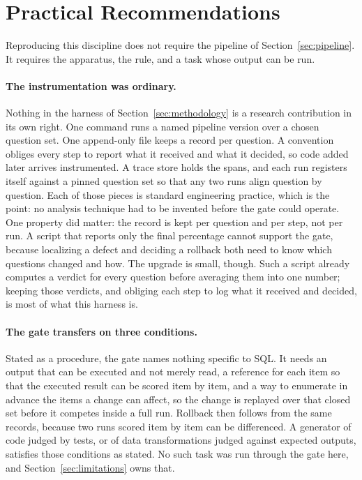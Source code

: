 \section{Practical Recommendations}
\label{sec:impact}

Reproducing this discipline does not require the pipeline of
Section~\ref{sec:pipeline}. It requires the apparatus, the rule, and a task
whose output can be run.

\paragraph{The instrumentation was ordinary.} Nothing in the harness of
Section~\ref{sec:methodology} is a research contribution in its own right. One
command runs a named pipeline version over a chosen question set. One
append-only file keeps a record per question. A convention obliges every step
to report what it received and what it decided, so code added later arrives
instrumented. A trace store holds the spans, and each run registers itself
against a pinned question set so that any two runs align question by question.
Each of those pieces is standard engineering practice, which is the point: no
analysis technique had to be invented before the gate could
operate. One property did matter: the record is kept per question and per
step, not per run. A script that reports only the final percentage cannot
support the gate, because localizing a defect and deciding a rollback both
need to know which questions changed and how. The upgrade is small, though.
Such a script already computes a verdict for every question before averaging
them into one number; keeping those verdicts, and obliging each step to log
what it received and decided, is most of what this harness is.

\paragraph{The gate transfers on three conditions.} Stated as a procedure, the
gate names nothing specific to SQL. It needs an output that can be executed
and not merely read, a reference for each item so that the executed result
can be scored item by item, and a way to enumerate in advance the items a
change can affect, so the change is replayed over that closed set before it
competes inside a full run. Rollback then follows from the same records,
because two runs scored item by item can be differenced. A generator of code
judged by tests, or of data transformations judged against expected outputs,
satisfies those conditions as stated. No such task was run through the gate
here, and Section~\ref{sec:limitations} owns that.

